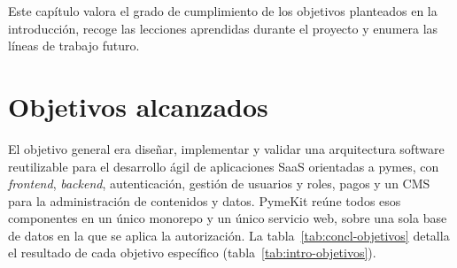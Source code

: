 
Este capítulo valora el grado de cumplimiento de los objetivos planteados en
la introducción, recoge las lecciones aprendidas durante el proyecto y
enumera las líneas de trabajo futuro.

\section{Objetivos alcanzados}
\label{sec:concl-objetivos}

El objetivo general era diseñar, implementar y validar una arquitectura
software reutilizable para el desarrollo ágil de aplicaciones SaaS orientadas
a pymes, con \textit{frontend}, \textit{backend}, autenticación, gestión de
usuarios y roles, pagos y un CMS para la administración de contenidos y datos.
PymeKit reúne todos esos componentes en un único monorepo y un único servicio
web, sobre una sola base de datos en la que se aplica la autorización. La
tabla~\ref{tab:concl-objetivos} detalla el resultado de cada objetivo
específico (tabla~\ref{tab:intro-objetivos}).


